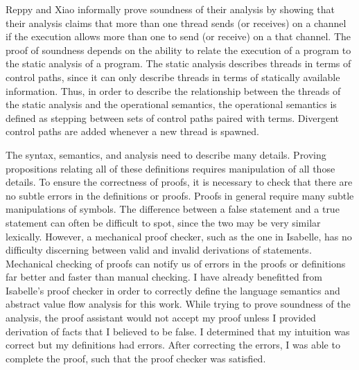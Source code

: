\documentclass{article}
\begin{document}
Reppy and Xiao informally prove soundness of their analysis by showing that their analysis
claims that more than one thread sends (or receives) on a channel if the execution allows more
than one to send (or receive) on a that channel.  The proof of soundness depends on the
ability to relate the execution of a program to the static analysis of a program.  The static
analysis describes threads in terms of control paths, since it can only describe threads in
terms of statically available information. Thus, in order to describe the relationship between
the threads of the static analysis and the operational semantics, the operational semantics is
defined as stepping between sets of control paths paired with terms.  Divergent control paths
are added whenever a new thread is spawned.

The syntax, semantics, and analysis need to describe many details.  Proving propositions
relating all of these definitions requires manipulation of all those details.  To ensure the
correctness of proofs, it is necessary to check that there are no subtle errors in the
definitions or proofs.  Proofs in general require many subtle manipulations of symbols.  The
difference between a false statement and a true statement can often be difficult to spot, since
the two may be very similar lexically.  However, a mechanical proof checker, such as the one in
Isabelle, has no difficulty discerning between valid and invalid derivations of statements.
Mechanical checking of proofs can notify us of errors in the proofs or definitions far better
and faster than manual checking.  I have already benefitted from Isabelle's proof checker in
order to correctly define the language semantics and abstract value flow analysis for this
work.  While trying to prove soundness of the analysis, the proof assistant would not accept my
proof unless I provided derivation of facts that I believed to be false.  I determined that my
intuition was correct but my definitions had errors.  After correcting the errors, I was able
to complete the proof, such that the proof checker was satisfied.
\end{document}
